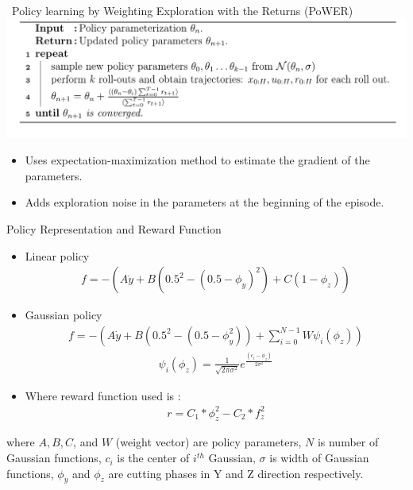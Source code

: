 \documentclass[aspectratio=169]{beamer}
\begin{document}
\begin{frame}{~}{Policy learning by Weighting Exploration with the Returns (PoWER)}
	\includegraphics[width=\textwidth]{images/power}
	
	\begin{itemize}
		\small 
		\item Uses expectation-maximization method to estimate the gradient of the parameters.
		\item Adds exploration noise in the parameters at the beginning of the episode.
	\end{itemize}
\end{frame}


\begin{frame}{Policy Representation and Reward Function}
	\vspace{-0.7cm}
	\small
	\begin{itemize}
		\item Linear policy \begin{align}
		f = -(A\dot{y} + B(0.5^{2} - (0.5 - \phi_{y})^{2}) + C(1-\phi_{z}))
		\end{align}
		\item Gaussian policy 
			\vspace{-0.7cm}
		\begin{align}
		f = -(A\dot{y} + B(0.5^{2} - (0.5 - \phi_{y}^{2})) + \sum_{i=0}^{N-1}W\psi_{i}(\phi_{z}))
		\end{align}
					\vspace{-0.7cm}
		\begin{align}
		\psi_{i}(\phi_{z}) = \frac{1}{\sqrt{2\pi\sigma^{2}}}e^{\frac{(c_{i} - \phi_{z})}{2\sigma^{2}}}
		\end{align}
		\vspace{-0.5cm}
			\item Where reward function used is : 
			\begin{align}
			r = C_{1}*\phi_{z}^{2} - C_{2}*f_{z}^{2}
			\end{align}
	\end{itemize}
	\vspace{-0.3cm}
	\scriptsize
	where $A, B, C$, and $W$ (weight vector) are policy parameters, $N$ is number of Gaussian functions, $c_{i}$ is the center of $i^{th}$ Gaussian, $\sigma$ is width of Gaussian functions, $\phi_{y}$ and $\phi_{z}$ are cutting phases in Y 
	and Z direction respectively.
\end{frame}
\end{document}
